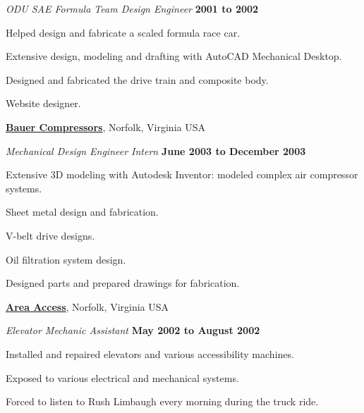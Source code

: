 \documentclass[10pt]{article}
\newenvironment{outerlist}[1][\enskip\textbullet]%
        {\begin{itemize}[#1]}{\end{itemize}%
         \vspace{-.6\baselineskip}}
\newenvironment{innerlist}[1][\enskip\textbullet]%
        {\begin{compactitem}[#1]}{\end{compactitem}}
\newcommand{\blankline}{\quad\pagebreak[2]}
\begin{document}
\begin{outerlist}
  \item[] \textit{ODU SAE Formula Team Design Engineer}%
    \hfill \textbf{2001 to 2002}
  \begin{innerlist}
    \item Helped design and fabricate a scaled formula race car.
    \item Extensive design, modeling and drafting with AutoCAD Mechanical Desktop.
    \item Designed and fabricated the drive train and composite body.
    \item Website designer.
  \end{innerlist}
\end{outerlist}

\blankline

\href{http://www.bauercomp.com/}{\textbf{Bauer Compressors}}, Norfolk, Virginia
USA
\begin{outerlist}
  \item[] \textit{Mechanical Design Engineer Intern}%
    \hfill \textbf{June 2003 to December 2003}
  \begin{innerlist}
    \item Extensive 3D modeling with Autodesk Inventor: modeled complex
        air compressor systems.
    \item Sheet metal design and fabrication.
    \item V-belt drive designs.
    \item Oil filtration system design.
    \item Designed parts and prepared drawings for fabrication.
  \end{innerlist}
\end{outerlist}

\blankline

\href{http://www.areaaccess.com/}{\textbf{Area Access}}, Norfolk, Virginia USA
\begin{outerlist}
  \item[] \textit{Elevator Mechanic Assistant}%
    \hfill \textbf{May 2002 to August 2002}
  \begin{innerlist}
    \item Installed and repaired elevators and various accessibility machines.
    \item Exposed to various electrical and mechanical systems.
    \item Forced to listen to Rush Limbaugh every morning during the truck
      ride.
  \end{innerlist}
\end{outerlist}
\end{document}
